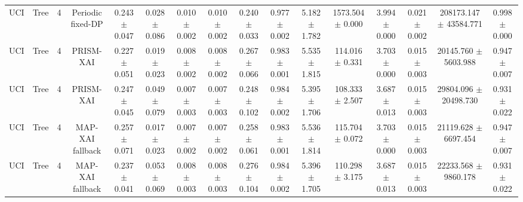 \begin{tabular}{lccccccccccccccc}
UCI & Tree & 4 & Periodic fixed-DP & 0.243 $\pm$ 0.047 & 0.028 $\pm$ 0.086 & 0.010 $\pm$ 0.002 & 0.010 $\pm$ 0.002 & 0.240 $\pm$ 0.033 & 0.977 $\pm$ 0.002 & 5.182 $\pm$ 1.782 & 1573.504 $\pm$ 0.000 & 3.994 $\pm$ 0.000 & 0.021 $\pm$ 0.002 & 208173.147 $\pm$ 43584.771 & 0.998 $\pm$ 0.000 \\
UCI & Tree & 4 & PRISM-XAI & 0.227 $\pm$ 0.051 & 0.019 $\pm$ 0.023 & 0.008 $\pm$ 0.002 & 0.008 $\pm$ 0.002 & 0.267 $\pm$ 0.066 & 0.983 $\pm$ 0.001 & 5.535 $\pm$ 1.815 & 114.016 $\pm$ 0.331 & 3.703 $\pm$ 0.000 & 0.015 $\pm$ 0.003 & 20145.760 $\pm$ 5603.988 & 0.947 $\pm$ 0.007 \\
UCI & Tree & 4 & PRISM-XAI & 0.247 $\pm$ 0.045 & 0.049 $\pm$ 0.079 & 0.007 $\pm$ 0.003 & 0.007 $\pm$ 0.003 & 0.248 $\pm$ 0.102 & 0.984 $\pm$ 0.002 & 5.395 $\pm$ 1.706 & 108.333 $\pm$ 2.507 & 3.687 $\pm$ 0.013 & 0.015 $\pm$ 0.003 & 29804.096 $\pm$ 20498.730 & 0.931 $\pm$ 0.022 \\
UCI & Tree & 4 & MAP-XAI fallback & 0.257 $\pm$ 0.071 & 0.017 $\pm$ 0.023 & 0.007 $\pm$ 0.002 & 0.007 $\pm$ 0.002 & 0.258 $\pm$ 0.061 & 0.983 $\pm$ 0.001 & 5.536 $\pm$ 1.814 & 115.704 $\pm$ 0.072 & 3.703 $\pm$ 0.000 & 0.015 $\pm$ 0.003 & 21119.628 $\pm$ 6697.454 & 0.947 $\pm$ 0.007 \\
UCI & Tree & 4 & MAP-XAI fallback & 0.237 $\pm$ 0.041 & 0.053 $\pm$ 0.069 & 0.008 $\pm$ 0.003 & 0.008 $\pm$ 0.003 & 0.276 $\pm$ 0.104 & 0.984 $\pm$ 0.002 & 5.396 $\pm$ 1.705 & 110.298 $\pm$ 3.175 & 3.687 $\pm$ 0.013 & 0.015 $\pm$ 0.003 & 22233.568 $\pm$ 9860.178 & 0.931 $\pm$ 0.022 \\
\bottomrule
\end{tabular}
